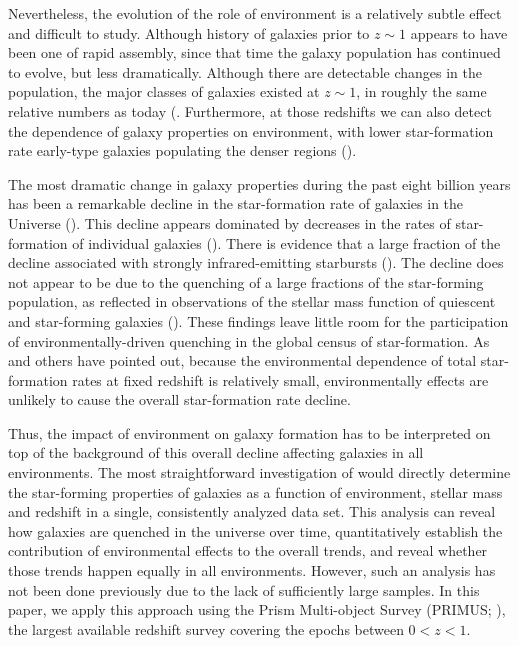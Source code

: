 \documentclass{emulateapj}
\begin{document}
Nevertheless, the evolution of the role of environment is a relatively
subtle effect and difficult to study.  Although history of galaxies
prior to $z\sim 1$ appears to have been one of rapid assembly, since
that time the galaxy population has continued to evolve, but less
dramatically. Although there are detectable changes in the population,
the major classes of galaxies existed at $z\sim 1$, in roughly the
same relative numbers as today (\citealt{bundy06a, borch06a,
taylor09a, moustakas13a}. Furthermore, at those redshifts we can also
detect the dependence of galaxy properties on environment, with lower
star-formation rate early-type galaxies populating the denser regions
(\citealt{cooper08a, patel09a, kovac10a}).

The most dramatic change in galaxy properties during the past eight
billion years has been a remarkable decline in the star-formation rate
of galaxies in the Universe (\citealt{hopkins06a}).  This decline
appears dominated by decreases in the rates of star-formation of
individual galaxies (\citealt{noeske07a}). There is evidence that a
large fraction of the decline associated with strongly
infrared-emitting starbursts (\citealt{bell05a, magnelli09a}).  The
decline does not appear to be due to the quenching of a large
fractions of the star-forming population, as reflected in observations
of the stellar mass function of quiescent and star-forming galaxies
(\citealt{blanton06a, bundy06a, borch06a, moustakas13a}).  These
findings leave little room for the participation of
environmentally-driven quenching in the global census of
star-formation.  As \citet{cooper08a} and others have pointed out,
because the environmental dependence of total star-formation rates at
fixed redshift is relatively small, environmentally effects are
unlikely to cause the overall star-formation rate decline.

Thus, the impact of environment on galaxy formation has to be
interpreted on top of the background of this overall decline affecting
galaxies in all environments.  The most straightforward investigation
of would directly determine the star-forming properties of galaxies as
a function of environment, stellar mass and redshift in a single,
consistently analyzed data set. This analysis can reveal how galaxies
are quenched in the universe over time, quantitatively establish the
contribution of environmental effects to the overall trends, and
reveal whether those trends happen equally in all environments.
However, such an analysis has not been done previously due to the lack
of sufficiently large samples. In this paper, we apply this approach
using the Prism Multi-object Survey (PRIMUS; \citealt{coil11a,
cool13a}), the largest available redshift survey covering the epochs
between $0<z<1$.
\end{document}
